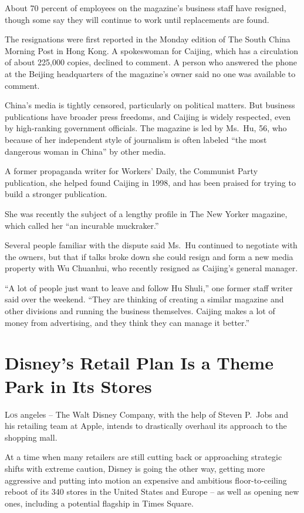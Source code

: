 ﻿\documentclass[12pt]{article}
\begin{document}
About 70 percent of employees on the magazine's business staff have resigned, though some say they
will continue to work until replacements are found.

The resignations were first reported in the Monday edition of The South China Morning Post in Hong
Kong. A spokeswoman for Caijing, which has a circulation of about 225,000 copies, declined to
comment. A person who answered the phone at the Beijing headquarters of the magazine's owner said no
one was available to comment.

China's media is tightly censored, particularly on political matters. But business publications have
broader press freedoms, and Caijing is widely respected, even by high-ranking government officials.
The magazine is led by Ms.~Hu, 56, who because of her independent style of journalism is often
labeled ``the most dangerous woman in China'' by other media.

A former propaganda writer for Workers' Daily, the Communist Party publication, she helped found
Caijing in 1998, and has been praised for trying to build a stronger publication.

She was recently the subject of a lengthy profile in The New Yorker magazine, which called her ``an
incurable\cite{incurable} muckraker.''

Several people familiar with the dispute said Ms.~Hu continued to negotiate with the owners, but
that if talks broke down she could resign and form a new media property with Wu Chuanhui, who
recently resigned as Caijing's general manager.

``A lot of people just want to leave and follow Hu Shuli,'' one former staff writer said over the
weekend. ``They are thinking of creating a similar magazine and other divisions and running the
business themselves. Caijing makes a lot of money from advertising, and they think they can manage
it better.''

\section{Disney's Retail Plan Is a Theme Park in Its Stores }

\lettrine{L}{os} angeles -- The Walt Disney Company, with the help of Steven
P.~Jobs and his retailing team at Apple, intends to drastically overhaul its approach to the
shopping mall.

At a time when many retailers are still cutting back or approaching strategic shifts with extreme
caution, Disney is going the other way, getting more aggressive and putting into motion an expensive
and ambitious floor-to-ceiling reboot of its 340 stores in the United States and Europe -- as well
as opening new ones, including a potential flagship in Times Square.
\end{document}
